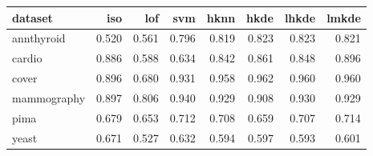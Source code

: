 \begin{tabular}{l|rrr|rrrr}
  \toprule
dataset & iso & lof & svm & hknn & hkde & lhkde & lmkde \\ 
  \midrule
annthyroid & 0.520 & 0.561 & 0.796 & 0.819 & 0.823 & 0.823 & 0.821 \\ 
  cardio & 0.886 & 0.588 & 0.634 & 0.842 & 0.861 & 0.848 & 0.896 \\ 
  cover & 0.896 & 0.680 & 0.931 & 0.958 & 0.962 & 0.960 & 0.960 \\ 
  mammography & 0.897 & 0.806 & 0.940 & 0.929 & 0.908 & 0.930 & 0.929 \\ 
  pima & 0.679 & 0.653 & 0.712 & 0.708 & 0.659 & 0.707 & 0.714 \\ 
  yeast & 0.671 & 0.527 & 0.632 & 0.594 & 0.597 & 0.593 & 0.601 \\ 
   \bottomrule
\end{tabular}
